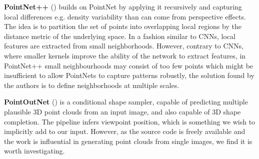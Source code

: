 \textbf{PointNet++} (\cite{qi2017pointnet}) 
builds on PointNet by applying it recursively and capturing local differences e.g. density variability than can come from perspective effects. The idea is to partition the set of points into overlapping local regions by the distance metric of the underlying space. In a fashion similar to CNNs, local features are extracted from small neighborhoods. However, contrary to CNNs, where smaller kernels improve the ability of the network to extract features, in PointNet++ small neighbourhoods may consist of too few points which might be insufficient to allow PointNets to capture patterns robustly, the solution found by the authors is to define neighborhoods at multiple scales.

\textbf{PointOutNet} (\cite{fan2016point}) is a conditional shape sampler, capable of predicting multiple plausible 3D point clouds from an input image, and also capable of 3D shape completion. The pipeline infers viewpoint position, which is something we wish to implicitly add to our input. However, as the source code is freely available and the work is influential in generating point clouds from single images, we find it is worth investigating.
